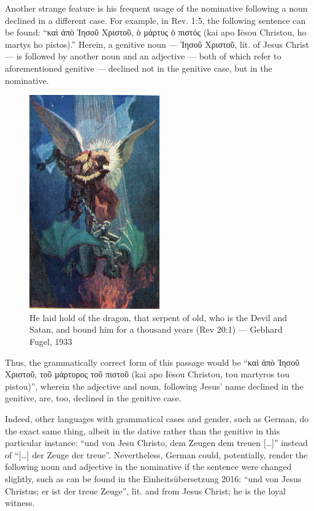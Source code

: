  Another strange feature is his frequent usage of the nominative following a noun declined in a different case. For example, in Rev. 1:5, the following sentence can be found: “καὶ ἀπὸ Ἰησοῦ Χριστοῦ, ὁ μάρτυς ὁ πιστός (kai apo Iēsou Christou, ho martys ho pistos).” Herein, a genitive noun — Ἰησοῦ Χριστοῦ, lit. of Jesus Christ — is followed by another noun and an adjective — both of which refer to aforementioned genitive — declined not in the genitive case, but in the nominative.

\begin{figure}
	\centering
	\includegraphics[width=0.5\textwidth]{images/linguisticpeculiarities/fugelangelfromheaven.jpg}
	\small\caption{He laid hold of the dragon, that serpent of old, who is the Devil and Satan, and bound him for a thousand years (Rev 20:1) — Gebhard Fugel, 1933}
\end{figure}

Thus, the grammatically correct form of this passage would be “καὶ ἀπὸ Ἰησοῦ Χριστοῦ, τοῦ μάρτυρος τοῦ πιστοῦ (kai apo Iēsou Christou, tou martyros tou pistou)”, wherein the adjective and noun, following Jesus’ name declined in the genitive, are, too, declined in the genitive case.

Indeed, other languages with grammatical cases and gender, such as German, do the exact same thing, albeit in the dative rather than the genitive in this particular instance: “und von Jesu Christo, dem Zeugen dem treuen […]” instead of “[…] der Zeuge der treue”. Nevertheless, German could, potentially, render the following noun and adjective in the nominative if the sentence were changed slightly, such as can be found in the Einheitsübersetzung 2016: “und von Jesus Christus; er ist der treue Zeuge”, lit. and from Jesus Christ; he is the loyal witness.

